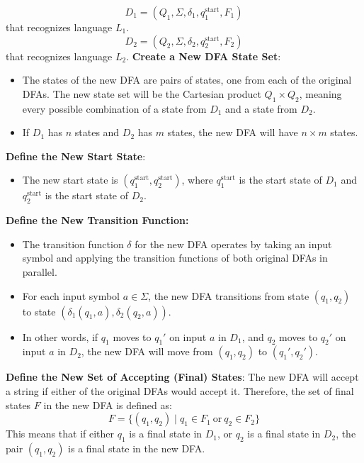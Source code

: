 \documentclass{report}
\begin{document}
\begin{itemize}
        \[
            D_1 = (Q_1, \Sigma, \delta_1, q_1^{\text{start}}, F_1)
        \]
        that recognizes language \( L_1 \).
        \[
            D_2 = (Q_2, \Sigma, \delta_2, q_2^{\text{start}}, F_2)
        \]
        that recognizes language \( L_2 \).
        \bigbreak \noindent 
        \textbf{Create a New DFA State Set}:
        \bigbreak \noindent 
        \begin{itemize}
            \item The states of the new DFA are pairs of states, one from each of the original DFAs. The new state set will be the Cartesian product \(Q_1 \times Q_2\), meaning every possible combination of a state from \(D_1\) and a state from \(D_2\).
            \item If \(D_1\) has \(n\) states and \(D_2\) has \(m\) states, the new DFA will have \(n \times m\) states.
        \end{itemize}
        \bigbreak \noindent 
        \textbf{Define the New Start State}:
        \begin{itemize}
            \item The new start state is \((q_1^{\text{start}}, q_2^{\text{start}})\), where \(q_1^{\text{start}}\) is the start state of \(D_1\) and \(q_2^{\text{start}}\) is the start state of \(D_2\).
        \end{itemize}
        \textbf{Define the New Transition Function:}
        \begin{itemize}
            \item The transition function \(\delta\) for the new DFA operates by taking an input symbol and applying the transition functions of both original DFAs in parallel.
            \item For each input symbol \(a \in \Sigma\), the new DFA transitions from state \((q_1, q_2)\) to state \((\delta_1(q_1, a), \delta_2(q_2, a))\).
            \item In other words, if \(q_1\) moves to \(q_1'\) on input \(a\) in \(D_1\), and \(q_2\) moves to \(q_2'\) on input \(a\) in \(D_2\), the new DFA will move from \((q_1, q_2)\) to \((q_1', q_2')\).
        \end{itemize}
        \bigbreak \noindent 
        \textbf{Define the New Set of Accepting (Final) States}:
        The new DFA will accept a string if either of the original DFAs would accept it. Therefore, the set of final states \( F \) in the new DFA is defined as:
        \[
            F = \{ (q_1, q_2) \mid q_1 \in F_1 \ \text{or} \ q_2 \in F_2 \}
        \]
        This means that if either \( q_1 \) is a final state in \( D_1 \), or \( q_2 \) is a final state in \( D_2 \), the pair \( (q_1, q_2) \) is a final state in the new DFA.

\end{itemize}
\end{document}
